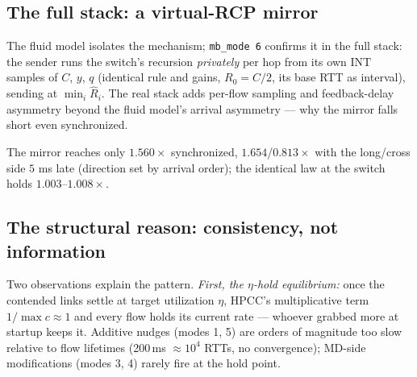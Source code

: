 \documentclass[conference]{IEEEtran}
\begin{document}
\subsection{The full stack: a virtual-RCP mirror}
\label{sec:vrcp}

The fluid model isolates the mechanism; \texttt{mb\_mode 6} confirms it in the full stack:
the sender runs the switch's recursion \emph{privately} per hop from its own INT samples of
$C$, $y$, $q$ (identical rule and gains, $R_0 = C/2$, its base RTT as interval), sending at
$\min_i \hat R_i$. The real stack adds per-flow sampling and feedback-delay asymmetry beyond
the fluid model's arrival asymmetry --- why the mirror falls short even synchronized.

The mirror reaches only $1.560\times$ synchronized, $1.654$/$0.813\times$ with the
long/cross side $5$ ms late (direction set by arrival order); the identical law at the switch
holds $1.003$--$1.008\times$.

\subsection{The structural reason: consistency, not information}

Two observations explain the pattern. \emph{First, the $\eta$-hold equilibrium:} once the
contended links settle at target utilization $\eta$, HPCC's multiplicative term
$1/\max c \approx 1$ and every flow holds its current rate --- whoever grabbed more at startup
keeps it. Additive nudges (modes 1, 5) are orders of magnitude too slow relative to flow lifetimes
(200\,ms ${\approx} 10^4$ RTTs, no convergence); MD-side modifications (modes 3, 4) rarely
fire at the hold point.
\end{document}
